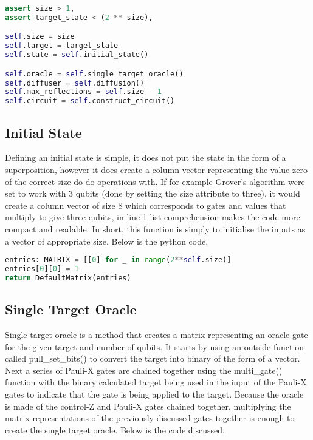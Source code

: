 \documentclass{article}
\begin{document}
\begin{file}
\begin{lstlisting}[language=Python]
assert size > 1, 
assert target_state < (2 ** size),

self.size = size
self.target = target_state
self.state = self.initial_state()

self.oracle = self.single_target_oracle()
self.diffuser = self.diffusion()
self.max_reflections = self.size - 1
self.circuit = self.construct_circuit()
\end{lstlisting}
\end{file}

\subsection{Initial State}

Defining an initial state is simple, it does not put the state in the form of a superposition, however it does create a column vector representing the value zero of the correct size do do operations with. If for example Grover's algorithm were set to work with 3 qubits (done by setting the size attribute to three), it would create a column vector of size 8 which corresponds to gates and values that multiply to give three qubits, in line 1 list comprehension makes the code more compact and readable. In short, this function is simply to initialise the inputs as a vector of appropriate size. Below is the python code.

\begin{file}
\begin{lstlisting}[language=Python]
entries: MATRIX = [[0] for _ in range(2**self.size)]
entries[0][0] = 1
return DefaultMatrix(entries)
\end{lstlisting}
\end{file}

\subsection{Single Target Oracle}

Single target oracle is a method that creates a matrix representing an oracle gate for the given target and number of qubits. It starts by using an outside function called pull\_set\_bits() to convert the target into binary of the form of a vector. Next a series of Pauli-X gates are chained together using the multi\_gate() function with the binary calculated target being used in the input of the Pauli-X gates to indicate that the gate is being applied to the target. Because the oracle is made of the control-Z and Pauli-X gates chained together, multiplying the matrix representations of the previously discussed gates together is enough to create the single target oracle. Below is the code discussed.
\end{document}
